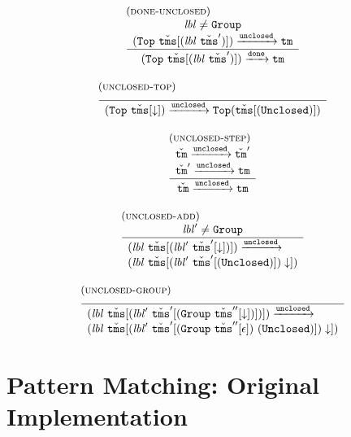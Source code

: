 \documentclass{article}
\newcommand{\rulename}{\textsc}
\newcommand{\irule}[3]{\begin{array}{l}{~\small\mbox{(\rulename{#1})}}\\\;\frac{\begin{array}{c}#2\end{array}}{\begin{array}{l}#3\end{array}}\end{array}}
\newcommand{\labelFont}{\texttt}
\newcommand{\lbl}{\ensuremath{\mathit{lbl}}}
\newcommand{\Top}{\ensuremath{\labelFont{Top}}}
\newcommand{\Group}{\ensuremath{\labelFont{Group}}}
\newcommand{\Unclosed}{\ensuremath{\labelFont{Unclosed}}}
\newcommand{\tm}{\ensuremath{\mathtt{tm}}}
\newcommand{\tms}{\ensuremath{\mathtt{tms}}}
\newcommand{\Tm}{\ensuremath{\check{\tm}}}
\newcommand{\Tms}{\ensuremath{\check{\tms}}}
\newcommand{\unclosed}{\ensuremath{\texttt{unclosed}}}
\newcommand{\done}{\ensuremath{\texttt{done}}}
\newcommand{\cursor}{\ensuremath{\downarrow}}
\newcommand{\steps}[1]{\ensuremath{\xrightarrow{#1}}}
\begin{document}
\[
  \begin{array}{c}
    \irule{done-unclosed}{
    \lbl \neq \Group\\
    (\Top~\Tms[(\lbl~\Tms')]) \steps{\unclosed} \tm\\
    }{
    (\Top~\Tms[(\lbl~\Tms')]) \steps{\done} \tm
    }
    \\\\
    \irule{unclosed-top}{}{
    (\Top~\Tms[\cursor]) \steps{\unclosed} \Top(\Tms[(\Unclosed)])
    }
    \\\\
    \irule{unclosed-step}{
    \Tm \steps{\unclosed} \Tm'\\
    \Tm' \steps{\unclosed} \tm
    }{
    \Tm \steps{\unclosed} \tm
    }
    \\\\
    \irule{unclosed-add}{
    \lbl' \neq \Group
    }{
    (\lbl~\Tms[(\lbl'~\Tms'[\cursor])]) \steps{\unclosed}\\
    (\lbl~\Tms[(\lbl'~\Tms'[(\Unclosed)]) \cursor])
    }
    \\\\
    \irule{unclosed-group}{}{
    (\lbl~\Tms[(\lbl'~\Tms'[(\Group~\Tms''[\cursor])])]) \steps{\unclosed}\\
    (\lbl~\Tms[(\lbl'~\Tms'[(\Group~\Tms''[\epsilon]) ~ (\Unclosed)]) \cursor])
    }
  \end{array}
\]

\section{Pattern Matching: Original Implementation}
\end{document}
